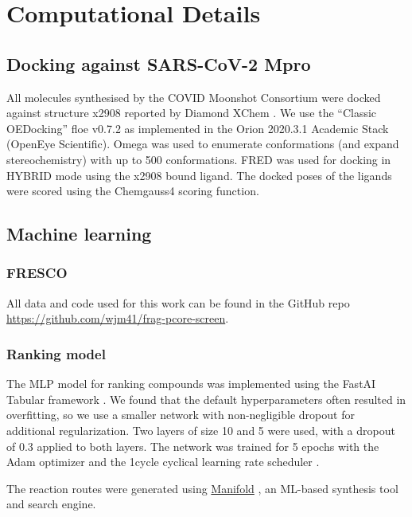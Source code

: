 

\chapter{Computational Details} \label{appendix:details}

\section{Docking against SARS-CoV-2 Mpro} \label{appendix:docking}
All molecules synthesised by the COVID Moonshot Consortium were docked against structure x2908 reported by Diamond XChem \cite{Douangamath2020XChem}. We use the “Classic OEDocking” floe v0.7.2 as implemented in the Orion 2020.3.1 Academic Stack (OpenEye Scientific). Omega was used to enumerate conformations (and expand stereochemistry) with up to 500 conformations. FRED was used for docking in HYBRID mode using the x2908 bound ligand. The docked poses of the ligands were scored using the Chemgauss4 scoring function.

\section{Machine learning} \label{appendix:machine_learning}
\subsection{FRESCO} \label{appendix:fresco}
All data and code used for this work can be found in the GitHub repo \url{https://github.com/wjm41/frag-pcore-screen}.

\subsection{Ranking model} \label{appendix:ranking}

The MLP model for ranking compounds was implemented using the FastAI Tabular framework \cite{howard2018fastai}. We found that the default hyperparameters often resulted in overfitting, so we use a smaller network with non-negligible dropout for additional regularization. Two layers of size 10 and 5 were used, with a dropout of 0.3 applied to both layers. The network was trained for 5 epochs with the Adam optimizer \cite{Kingma2014Adam} and the 1cycle cyclical learning rate scheduler \cite{smith2018superconvergence}.

The reaction routes were generated using \href{https://app.postera.ai}{Manifold} \cite{PosteraManifold}, an ML-based synthesis tool and search engine.

